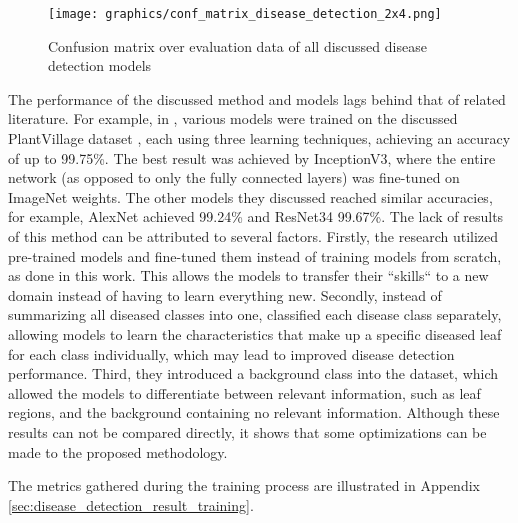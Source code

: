 \documentclass[draft,final]{vutinfth} %
\begin{document}
\begin{figure}
    \centering
    \texttt{[image: graphics/conf\_matrix\_disease\_detection\_2x4.png]}
    \caption{Confusion matrix over evaluation data of all discussed disease detection models}
    \label{fig:confusion_matrix_disease_detection_masked}
\end{figure}

The performance of the discussed method and models lags behind that of related literature. For example, in \cite{brahimi_deep_2018}, various models were trained on the discussed PlantVillage dataset \cite{hughes_open_2016}, each using three learning techniques, achieving an accuracy of up to 99.75\%. The best result was achieved by InceptionV3, where the entire network (as opposed to only the fully connected layers) was fine-tuned on ImageNet weights. The other models they discussed reached similar accuracies, for example, AlexNet achieved 99.24\% and ResNet34 99.67\%. The lack of results of this method can be attributed to several factors. Firstly, the research utilized pre-trained models and fine-tuned them instead of training models from scratch, as done in this work. This allows the models to transfer their ``skills`` to a new domain instead of having to learn everything new. Secondly, instead of summarizing all diseased classes into one, \citeauthor{brahimi_deep_2018} classified each disease class separately, allowing models to learn the characteristics that make up a specific diseased leaf for each class individually, which may lead to improved disease detection performance. Third, they introduced a background class into the dataset, which allowed the models to differentiate between relevant information, such as leaf regions, and the background containing no relevant information. Although these results can not be compared directly, it shows that some optimizations can be made to the proposed methodology.

The metrics gathered during the training process are illustrated in Appendix \ref{sec:disease_detection_result_training}.
\end{document}
